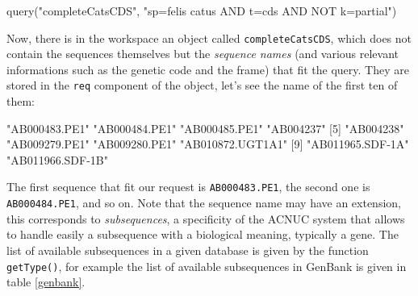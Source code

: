 \documentclass{article}
\begin{document}

\begin{Schunk}
\begin{Sinput}
 query("completeCatsCDS", "sp=felis catus AND t=cds AND NOT k=partial")
\end{Sinput}
\end{Schunk}

Now, there is in the workspace an object called \texttt{completeCatsCDS}, which
does not contain the sequences themselves but the \emph{sequence names} (and various relevant informations
such as the genetic code and the frame) that fit 
the query. They are stored in the \texttt{req} component of the object,
let's see the name of the first ten of them:

\begin{Schunk}
\begin{Soutput}
 [1] "AB000483.PE1"    "AB000484.PE1"    "AB000485.PE1"    "AB004237"       
 [5] "AB004238"        "AB009279.PE1"    "AB009280.PE1"    "AB010872.UGT1A1"
 [9] "AB011965.SDF-1A" "AB011966.SDF-1B"
\end{Soutput}
\end{Schunk}

The first sequence that fit our request is \texttt{AB000483.PE1},
the second one is \texttt{AB000484.PE1}, and so on. Note that
the sequence name may have an extension, this corresponds to \emph{subsequences},
a specificity of the ACNUC system that allows to handle easily a
subsequence with a biological meaning, typically a gene. The list of available subsequences
in a given database is given by the function \texttt{getType()}, for example the list
of available subsequences in GenBank is given in table \ref{genbank}.
\end{document}
